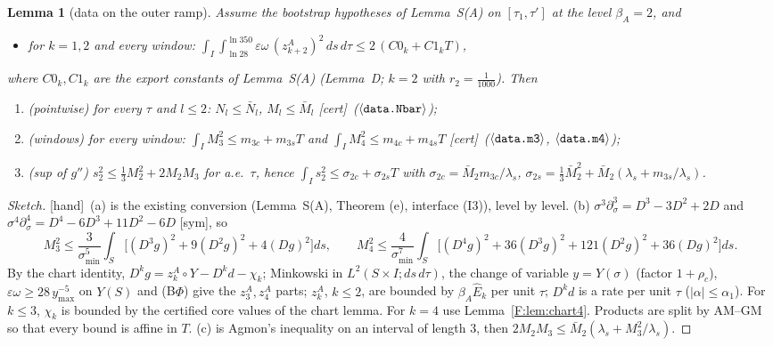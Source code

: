 \documentclass[11pt]{article}
\newtheorem{lemma}{Lemma}\newtheorem{proposition}{Proposition}\newtheorem{remark}{Remark}
\newcommand{\cst}[1]{\ensuremath{\langle\texttt{\detokenize{#1}}\rangle}}
\newcommand{\tC}{\textup{[cert]}}\newcommand{\tH}{\textup{[hand]}}\newcommand{\tE}{\textup{[est]}}\newcommand{\tS}{\textup{[sym]}}
\begin{document}
\begin{lemma}[data on the outer ramp]\label{F:lem:data}
Assume the bootstrap hypotheses of Lemma~S(A) on $[\tau_1,\tau']$ at the level $\beta_A=2$, and
\begin{itemize}[leftmargin=3.2em]
\item[\textup{(B$\Phi$)}] for $k=1,2$ and every window: $\displaystyle\int_I\!\int_{\ln28}^{\ln350}\varepsilon\omega\,(z^A_{k+2})^2\,ds\,d\tau\le2\,(C0_k+C1_kT)$,
\end{itemize}
where $C0_k,C1_k$ are the export constants of Lemma~S(A) (Lemma~D; $k=2$ with $r_2=\frac1{1000}$). Then
\begin{enumerate}[label=(\alph*)]
\item \emph{(pointwise)} for every $\tau$ and $l\le2$: $N_l\le\bar N_l$, $M_l\le\bar M_l$ \tC\ (\cst{data.Nbar});
\item \emph{(windows)} for every window: $\int_IM_3^2\le m_{3c}+m_{3s}T$ and $\int_IM_4^2\le m_{4c}+m_{4s}T$ \tC\ (\cst{data.m3}, \cst{data.m4});
\item \emph{(sup of $g''$)} $s_2^2\le\frac13M_2^2+2M_2M_3$ for a.e.\ $\tau$, hence $\int_Is_2^2\le\sigma_{2c}+\sigma_{2s}T$ with $\sigma_{2c}=\bar M_2m_{3c}/\lambda_s$, $\sigma_{2s}=\frac13\bar M_2^2+\bar M_2(\lambda_s+m_{3s}/\lambda_s)$.
\end{enumerate}
\end{lemma}
\begin{proof}[Sketch]\tH\ (a) is the existing conversion (Lemma~S(A), Theorem (e), interface (I3)), level by level. (b) $\sigma^3\partial_\sigma^3=D^3-3D^2+2D$ and $\sigma^4\partial_\sigma^4=D^4-6D^3+11D^2-6D$ \tS, so
\[M_3^2\le\frac3{\sigma_{\min}^5}\int_S\bigl[(D^3g)^2+9(D^2g)^2+4(Dg)^2\bigr]ds,\qquad M_4^2\le\frac4{\sigma_{\min}^7}\int_S\bigl[(D^4g)^2+36(D^3g)^2+121(D^2g)^2+36(Dg)^2\bigr]ds .\]
By the chart identity, $D^kg=z^A_k\circ Y-D^kd-\chi_k$; Minkowski in $L^2(S\times I;ds\,d\tau)$, the change of variable $y=Y(\sigma)$ (factor $1+\rho_c$), $\varepsilon\omega\ge28\,y_{\max}^{-5}$ on $Y(S)$ and (B$\Phi$) give the $z^A_3,z^A_4$ parts; $z^A_k$, $k\le2$, are bounded by $\beta_A\hat E_k$ per unit $\tau$; $D^kd$ is a rate per unit $\tau$ ($|\alpha|\le\alpha_1$). For $k\le3$, $\chi_k$ is bounded by the certified core values of the chart lemma. For $k=4$ use Lemma~\ref{F:lem:chart4}. Products are split by AM--GM so that every bound is affine in $T$. (c) is Agmon's inequality on an interval of length $3$, then $2M_2M_3\le\bar M_2(\lambda_s+M_3^2/\lambda_s)$.
\end{proof}
\end{document}
